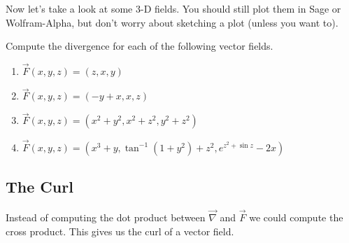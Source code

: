 Now let's take a look at some 3-D fields. You should still plot them in Sage or Wolfram-Alpha, but don't worry about sketching a plot (unless you want to).

\begin{problem}\label{3d_div}
Compute the divergence for each of the following vector fields.
\begin{enumerate}
 \item $\vec F(x,y,z) = \left(z,x,y \right)$
 \item $\vec F(x,y,z) = \left(-y+x,x,z \right)$
 \item $\vec F(x,y,z) = \left(x^2+y^2,x^2+z^2,y^2+z^2 \right)$
 \item $\vec F(x,y,z) = \left(x^3+y,\tan^{-1}(1+y^2) + z^2,e^{z^2+\sin z} -2x\right)$
\end{enumerate}
\end{problem}

\subsection{The Curl}

Instead of computing the dot product between $\vec \nabla$ and $\vec F$ we could compute the cross product. This gives us the curl of a vector field.\\


